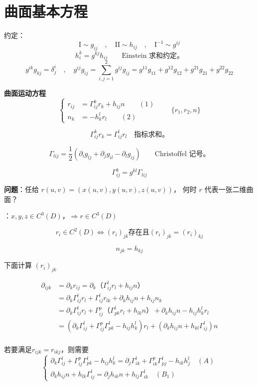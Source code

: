 \documentclass[lang=cn,10pt,thmcnt=section]{elegantbook}
\begin{document}
\section{曲面基本方程}
约定：
\[
\mathrm{I} \sim g_{ij} \quad , \quad \mathrm{II} \sim h_{ij} \quad , \quad \mathrm{I}^{-1} \sim g^{ij}
\]
\[
h^k_i = g^{kj} h_{ij} \qquad \text{Einstein 求和约定。}
\]
\[
g^{ik} g_{kj} = \delta^i_j \quad , \quad g^{ij} g_{ij} = \sum_{i,j=1}^{2} g^{ij} g_{ij} = g^{11} g_{11} + g^{12} g_{12} + g^{21} g_{21} + g^{22} g_{22}
\]

\textbf{曲面运动方程}
\[
\left\{
\begin{aligned}
    r_{ij} &= \Gamma_{ij}^k r_k + h_{ij} n \quad \quad (1) \\
    n_k &= -h_k^l r_l \quad \quad (2)
\end{aligned}
\right.
\qquad \{r_1, r_2, n\}
\]

\[
\Gamma_{ij}^k r_k = \Gamma_{ij}^l r_l \quad \text{指标求和。}
\]

\[
\Gamma_{lij} = \frac{1}{2} \left( \partial_i g_{lj} + \partial_j g_{il} - \partial_l g_{ij} \right) \qquad \text{Christoffel 记号。}
\]

\[
\Gamma_{ij}^k = g^{kl} \Gamma_{lij}
\]

\textbf{问题}：任给 $r(u,v) = (x(u,v), y(u,v), z(u,v))$，  
何时 $r$ 代表一张二维曲面？

：$x, y, z \in C^3(D)$，$\Rightarrow r \in C^3(D)$

\[
r_i \in C^2(D) \iff (r_i)_{jk} \text{存在且}(r_i)_{jk} = (r_i)_{kj}
\]



\[
n_{jk} = h_{kj}
\]

下面计算 $(r_{i})_{jk}$

\begin{align*}
    \partial_{ijk}&=\partial_{k}r_{ij}=\partial_{k}（\Gamma_{ij}^l r_l + h_{ij} n）\\
    &= \partial_{k} \Gamma_{ij}^l r_l + \Gamma_{ij}^l r_{lk} + \partial_{k} h_{ij} n + h_{ij} n_{k}\\
    &=\partial_{k} \Gamma_{ij}^l r_l +\Gamma_{ij}^p（\Gamma_{pk}^l r_l + h_{lk} n）+ \partial_{k} h_{ij} n - h_{ij}h^l_k r_{l}\\
    &=(\partial_{k} \Gamma_{ij}^l+\Gamma_{ij}^p\Gamma_{pk}^l-h_{ij}h^l_k)r_l+(\partial_{k} h_{ij} n + h_{kl}\Gamma_{ij}^l)n\\
\end{align*}

若要满足$r_{ijk}=r_{ikj}$，则需要
\[
\begin{cases}
    \partial_{k} \Gamma_{ij}^l+\Gamma_{ij}^p\Gamma_{pk}^l-h_{ij}h^l_k=\partial_{j} \Gamma_{ik}^l+\Gamma_{ik}^p\Gamma_{pj}^l-h_{ik}h^l_j\quad(A)\\
    \partial_{k} h_{ij} n + h_{lk}\Gamma_{ij}^l= \partial_{j} h_{ik} n + h_{lj}\Gamma_{ik}^l\quad(B_1)
\end{cases}
\]
\end{document}
